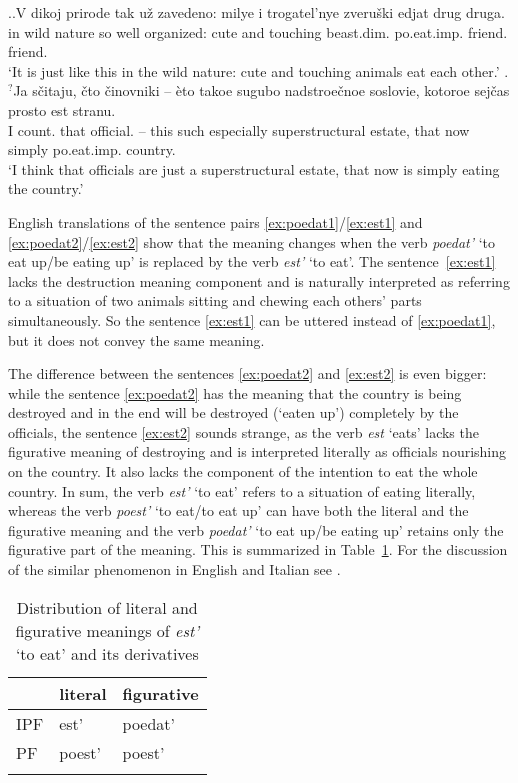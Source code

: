 \ex.\ag.\label{ex:est1}V dikoj prirode tak u\v{z} zavedeno: milye i trogatel'nye zveru\v{s}ki edjat drug druga.\\
in wild nature so well organized: cute and touching beast.dim. po.eat.imp. friend. friend.\\
\trans `It is just like this in the wild nature: cute and touching animals eat each other.'
\bg.$^?$Ja s\v{c}itaju, \v{c}to \v{c}inovniki -- \`{e}to takoe sugubo nadstroe\v{c}noe soslovie, kotoroe sej\v{c}as prosto est stranu.\label{ex:est2}\\
I count. that official. -- this such especially superstructural estate, that now simply po.eat.imp. country.\\
\trans `I think that officials are just a superstructural estate, that now is simply eating the country.'

English translations of the sentence pairs \ref{ex:poedat1}/\ref{ex:est1} and \ref{ex:poedat2}/\ref{ex:est2} show that  the meaning changes when the verb \textit{poedat'} `to eat up/be eating up' is replaced by the verb \textit{est'} `to eat'. The sentence~\ref{ex:est1} lacks the destruction meaning component and is naturally interpreted as referring to a situation of two animals sitting and chewing each others' parts simultaneously. So the sentence \ref{ex:est1} can be uttered instead of \ref{ex:poedat1}, but it does not convey the same meaning.

The difference between the sentences \ref{ex:poedat2} and \ref{ex:est2} is even bigger: while the sentence \ref{ex:poedat2} has the meaning that the country is being destroyed and in the end will be destroyed (`eaten up') completely by the officials, the sentence \ref{ex:est2} sounds strange, as the verb \textit{est} `eats' lacks the figurative meaning of destroying and is interpreted literally as officials nourishing on the country. It also lacks the component of the intention to eat the whole country. In sum, the verb \textit{est'} `to eat' refers to a situation of eating literally, whereas the verb \textit{poest'} `to eat/to eat up' can have both the literal and the figurative meaning and the verb \textit{poedat'} `to eat up/be eating up' retains only the figurative part of the meaning. This is summarized in Table~\ref{table:eat}. For the discussion of the similar phenomenon in English and Italian see \citet{FolliHarley:05}.

\begin{table}
\caption{Distribution of literal and figurative meanings of \textit{est'} `to eat' and its derivatives \label{table:eat}}
\begin{tabular}{lll}
\lsptoprule
& literal & figurative \\ \midrule
IPF & est' & poedat' \\
PF & poest' & poest' \\ \lspbottomrule
\end{tabular}
\end{table}

